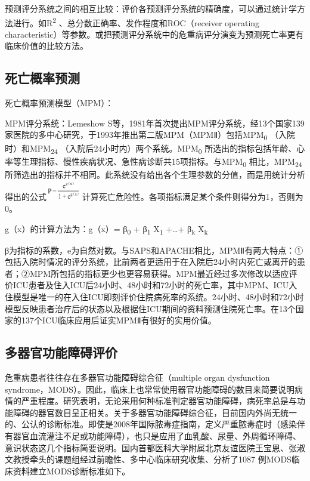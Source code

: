 预测评分系统之间的相互比较：评价各预测评分系统的精确度，可以通过统计学方法进行。如R\textsuperscript{2}
、总分数正确率、发作程度和ROC（receiver operating
characteristic）等参数。或把预测评分系统中的危重病评分演变为预测死亡率更有临床价值的比较方法。

\subsection{死亡概率预测}

死亡概率预测模型（MPM）：

MPM评分系统：Lemeshow
S等，1981年首次提出MPM评分系统，经13个国家139家医院的多中心研究，于1993年推出第二版MPM（MPMⅡ）包括MPM\textsubscript{0}
（入院时）和MPM\textsubscript{24}
（入院后24小时内）两个系统。MPM\textsubscript{0}
所选出的指标包括年龄、心率等生理指标、慢性疾病状况、急性病诊断共15项指标。与MPM\textsubscript{0}
相比，MPM\textsubscript{24}
所筛选出的指标并不相同。此系统没有给出各个生理参数的分值，而是用统计分析得出的公式\includegraphics[width=0.57292in,height=0.34375in]{./images/Image00542.jpg}
计算死亡危险性。各项指标满足某个条件则得分为1，否则为0。

g（x）的计算方法为：g（x）= β\textsubscript{0} + β\textsubscript{1}
X\textsubscript{1} +\ldots{}+ β\textsubscript{k} X\textsubscript{k}

β为指标的系数，e为自然对数。与SAPS和APACHE相比，MPMⅡ有两大特点：①包括入院时情况的评分系统，比前两者更适用于在入院后24小时内死亡或离开的患者；②MPM所包括的指标更少也更容易获得。MPM最近经过多次修改以适应评价ICU患者及住入ICU后24小时、48小时和72小时的死亡率，其中MPM、ICU入住模型是唯一的在入住ICU即刻评价住院病死率的系统。24小时、48小时和72小时模型反映患者治疗后的状态以及根据住ICU期间的资料预测住院死亡率。在13个国家的137个ICU临床应用后证实MPMⅡ有很好的实用价值。

\subsection{多器官功能障碍评价}

危重病患者往往存在多器官功能障碍综合征（multiple organ dysfunction
syndrome，MODS）。因此，临床上也常常使用器官功能障碍的数目来简要说明病情的严重程度。研究表明，无论采用何种标准判定器官功能障碍，病死率总是与功能障碍的器官数目呈正相关。关于多器官功能障碍综合征，目前国内外尚无统一的、公认的诊断标准。即使是2008年国际脓毒症指南，定义严重脓毒症时（感染伴有器官血流灌注不足或功能障碍），也只是应用了血乳酸、尿量、外周循环障碍、意识状态这几个指标简要说明。国内首都医科大学附属北京友谊医院王宝恩、张淑文教授牵头的课题组经过前瞻性、多中心临床研究收集、分析了1087
例MODS临床资料建立MODS诊断标准如下。

